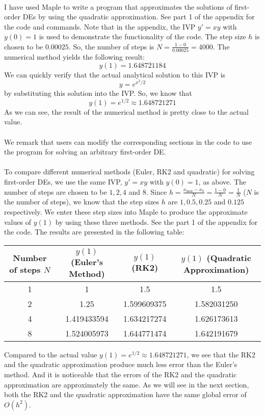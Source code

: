 \documentclass{article}
\begin{document}
\\
I have used Maple to write a program that approximates the solutions of first-order DEs by using the quadratic approximation.
See part 1 of the appendix for the code and commands. Note that in the appendix, the IVP \(y' = xy\) with \(y(0)=1\) is used
to demonstrate the functionality of the code. The step size \(h\) is chosen to be \(0.00025\).
So, the number of steps is \(N = \frac{1-0}{0.00025} = 4000\). The numerical method yields the following result:
\begin{equation}
  y(1) = 1.648721184
\end{equation}
We can quickly verify that the actual analytical solution to this IVP is
\begin{equation}
  y = e^{x^2/2}
\end{equation}
by substituting this solution into the IVP. So, we know that
\begin{equation}
  y(1) = e^{1/2} \approx 1.648721271
\end{equation}
As we can see, the result of the numerical method is pretty close to the actual value. \\
\\
We remark that users can modify the corresponding sections in the code to use the program for solving an arbitrary first-order DE.\\
\\
To compare different numerical methods (Euler, RK2 and quadratic) for solving first-order DEs, we use the same IVP,
\(y' = xy\) with \(y(0)=1\), as above. The number of steps are chosen to be \(1,2,4\) and \(8\). Since
\(h   = \frac{x_{\max} - x_0}{N} = \frac{1-0}{N} = \frac{1}{N}\) (\(N\) is the number of steps),
we know that the step sizes \(h\) are \(1, 0.5, 0.25\) and \(0.125\) respectively.
We enter these step sizes into Maple to produce the approximate values of \(y(1)\) by using these three methods.
See the part 1 of the appendix for the code. The results are presented in the following table:
\begin{center}
\begin{tabular}{||c |c| c| c||}
 \hline
  Number of steps \(N\) & \(y(1)\) (Euler's Method) & \(y(1)\) (RK2) & \(y(1)\) (Quadratic Approximation) \\ [0.5ex]
 \hline\hline
 1 & 1 & 1.5 & 1.5 \\
 \hline
 2 & 1.25 & 1.599609375 & 1.582031250 \\
 \hline
 4 & 1.419433594 & 1.634217274 & 1.626173613 \\
 \hline
 8 & 1.524005973 & 1.644771474 & 1.642191679\\
 \hline
\end{tabular}
\end{center}
Compared to the actual value \(y(1) = e^{1/2} \approx 1.648721271\), we see that the RK2 and the quadratic approximation
produce much less error than the Euler's method. And it is noticeable that the errors of the RK2 and the quadratic approximation
are approximately the same. As we will see in the next section, both the RK2 and the quadratic approximation have the same global
error of \(O(h^2)\).
\end{document}
